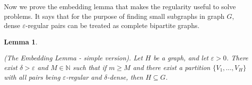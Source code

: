 \documentclass[12pt,twoside,a4paper,bibliography=totocnumbered]{book}
\numberwithin{equation}{section}
\newtheorem{lemma}     	[theorem] {Lemma}
\newtheorem{definition}	[theorem] {Definition}
\theoremstyle{remark}
\begin{document}
Now we prove the embedding lemma that makes the regularity useful to solve problems. It says that for the purpose of finding small subgraphs in graph $G$, dense $\varepsilon$-regular pairs can be treated as complete bipartite graphs.


\begin{lemma}\label{lemma:embeddinglemma}


(The Embedding Lemma - simple version). Let $H$ be a graph, and let $\varepsilon >0$. There exist $\delta >\varepsilon$ and $M \in \mathbb{N}$ such that if $m \geq M$ and there exist a partition $\{V_1, ..., V_H\}$ with all pairs being $\varepsilon$-regular and $\delta$-dense, then $H \subseteq G$. 
\end{lemma} 
\end{document}
